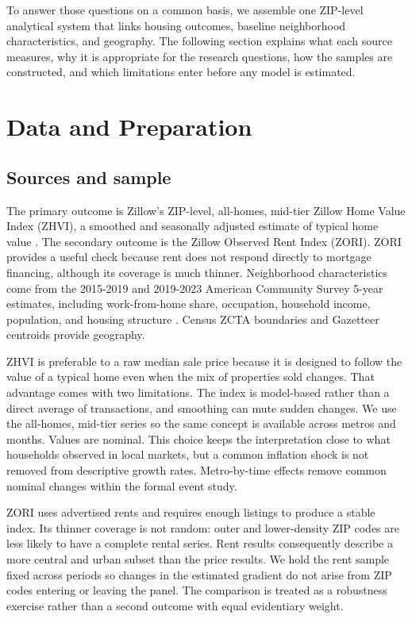 \documentclass[11pt]{article}
\begin{document}
To answer those questions on a common basis, we assemble one ZIP-level analytical system that links housing outcomes, baseline
neighborhood characteristics, and geography. The following section explains what each source measures, why it is appropriate for
the research questions, how the samples are constructed, and which limitations enter before any model is estimated.

\section{Data and Preparation}

\subsection{Sources and sample}

The primary outcome is Zillow's ZIP-level, all-homes, mid-tier Zillow Home Value Index (ZHVI), a smoothed and seasonally adjusted
estimate of typical home value \cite{zillow2026data}. The secondary outcome is the Zillow Observed Rent Index (ZORI). ZORI provides
a useful check because rent does not respond directly to mortgage financing, although its coverage is much thinner. Neighborhood
characteristics come from the 2015-2019 and 2019-2023 American Community Survey 5-year estimates, including work-from-home share,
occupation, household income, population, and housing structure \cite{census2026acs}. Census ZCTA boundaries and Gazetteer
centroids provide geography.

ZHVI is preferable to a raw median sale price because it is designed to follow the value of a typical home even when the mix of
properties sold changes. That advantage comes with two limitations. The index is model-based rather than a direct average of
transactions, and smoothing can mute sudden changes. We use the all-homes, mid-tier series so the same concept is available across
metros and months. Values are nominal. This choice keeps the interpretation close to what households observed in local markets,
but a common inflation shock is not removed from descriptive growth rates. Metro-by-time effects remove common nominal changes
within the formal event study.

ZORI uses advertised rents and requires enough listings to produce a stable index. Its thinner coverage is not random: outer and
lower-density ZIP codes are less likely to have a complete rental series. Rent results consequently describe a more central and
urban subset than the price results. We hold the rent sample fixed across periods so changes in the estimated gradient do not arise
from ZIP codes entering or leaving the panel. The comparison is treated as a robustness exercise rather than a second outcome with
equal evidentiary weight.
\end{document}
